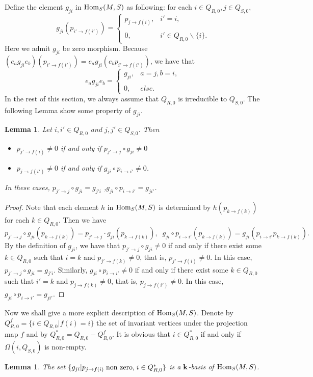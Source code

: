 \documentclass[a4paper, reqno]{amsart}
\newtheorem{lem}[thm]{Lemma}
\theoremstyle{definition}
\theoremstyle{remark}
\numberwithin{equation}{section}
\begin{document}
{\color{blue}Define the element $g_{ji}$ in $\textup{Hom}_S(M,S)$ as following: for each $i\in Q_{R,0},j\in Q_{S,0}$,
$$g_{j i}(p_{i'\to f(i')}) =\left\{\begin{array}{ll}
  p_{j\to f(i)} ,& i'=i,\\\\
0 ,& i'\in Q_{R,0}\backslash\{i\}.\end{array}\right.$$
Here we admit $g_{ji}$ be zero morphism. Because $(e_ag_{ji}e_b)(p_{i'\rightarrow f(i')})=e_a g_{ji}(e_bp_{i'\rightarrow f(i')})$, we have that
$$e_{a} g_{ji} e_{b} =\left\{\begin{array}{ll}
 g_{ji} ,& a=j, b=i,\\\\
0 ,& else.\end{array}\right.$$
In the rest of this section, we always assume that $Q_{R,0}$ is irreducible to $Q_{S,0}$. The following Lemma show some property of $g_{ji}$.

\begin{lem}\label{gp+pg}
Let $i,i'\in Q_{R,0}$ and $j,j'\in Q_{S,0}$. Then
\begin{itemize}
\item[(1)] $p_{j'\to f(i)}\neq0$ if and only if $p_{j'\to j}\circ g_{ji}\neq 0$
    \item[(2)] $p_{j\to f(i')}\neq0$ if and only if $g_{ji}\circ p_{i\to i'}\neq 0$.
\end{itemize}
 In these cases, $p_{j'\to j}\circ g_{ji}=g_{j'i}$ ,$g_{ji}\circ p_{i\to i'}=g_{ji'}$.
\end{lem}

\begin{proof}
Note that each element $h$ in $\textup{Hom}_S(M,S)$ is determined by $h(p_{k\to f(k)})$ for each $k\in Q_{R,0}$. Then we have
$$p_{j'\to j}\circ g_{ji}(p_{k\to f(k)})=p_{j'\to j}\cdot g_{ji}(p_{k\to f(k)}),\;\;g_{ji}\circ p_{i\to i'}(p_{k\to f(k)})=g_{ji}(p_{i\to i'}p_{k\to f(k)}).$$
By the definition of $g_{ji}$, we have that $p_{j'\to j}\circ g_{ji}\neq0$ if and only if there exist some $k\in Q_{R,0}$ such that $i=k$ and $p_{j'\to f(k)}\neq0$, that is, $p_{j'\to f(i)}\neq0$. In this case, $p_{j'\to j}\circ g_{ji}=g_{j'i}$. Similarly, $g_{ji}\circ p_{i\to i'}\neq0$ if and only if there exist some $k\in Q_{R,0}$ such that $i'=k$ and $p_{j\to f(k)}\neq0$, that is, $p_{j\to f(i')}\neq0$. In this case, $g_{ji}\circ p_{i\to i'}=g_{ji'}$.
\end{proof}

Now we shall give a more explicit description of $\textup{Hom}_S(M,S)$. Denote by $Q_{R,0}^{f}=\{i\in Q_{R,0}|f(i)=i\}$ the set of invariant vertices under the projection map $f$ and by $Q_{R,0}^{*}=Q_{R,0}-Q_{R,0}^{f}$. It is obvious that $i\in Q_{R,0}^{*}$ if and only if $\Omega(i,Q_{S,0})$ is non-empty. 

\begin{lem}\label{lemma 2.6}
The set $\{g_{ji}|p_{j\to f(i)}\textup{\;non zero,\;} i\in Q_{R,0}^{*}\}$ is a ${\bf k}$-basis of $\textup{Hom}_S(M,S)$.
\end{lem}}
\end{document}
